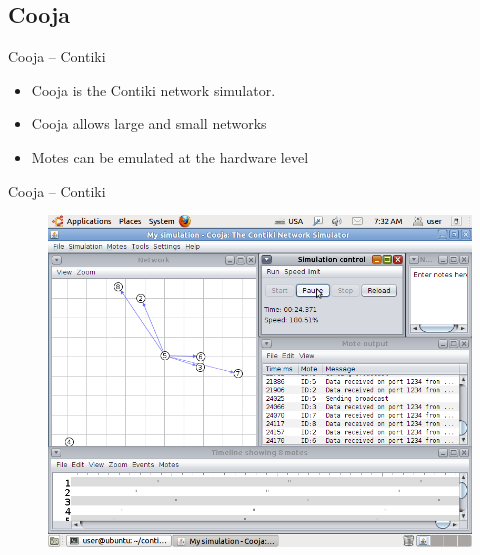 \documentclass{beamer}
\begin{document}
\subsection{Cooja}

\begin{frame}

\begin{block}{Cooja -- Contiki}

	\begin{itemize}
		\item Cooja is the Contiki network simulator.
		\item Cooja allows large and small networks
		\item Motes can be emulated at the hardware level
	\end{itemize}

\end{block}

\begin{block}{Cooja -- Contiki}

	\begin{figure}[t]
		\includegraphics[width=.8\linewidth]{img/cooja.png}
	\end{figure}

\end{block}

\end{frame}
\end{document}
